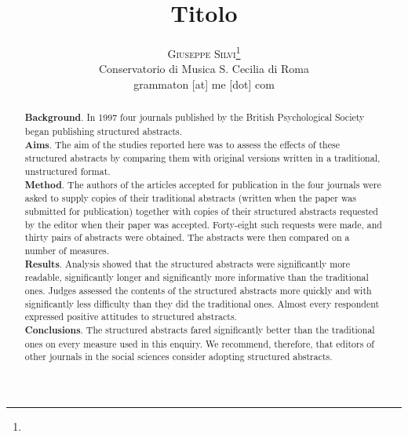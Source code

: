 \documentclass[twoside]{article}
\title{\vspace{-15mm}\fontsize{24pt}{10pt}\selectfont\textbf{Titolo}} %
\author{
\large
\textsc{Giuseppe Silvi}\thanks{}\\[2mm] %
\normalsize Conservatorio di Musica S. Cecilia di Roma \\ %
\normalsize grammaton [at] me [dot] com \\ %
\vspace{-5mm}
}
\date{}
\begin{document}
\maketitle %

\thispagestyle{fancy} %


\begin{abstract}

\noindent %
\textbf{Background}. In 1997 four journals published by the British Psychological Society began publishing structured abstracts.\\
\textbf{Aims}. The aim of the studies reported here was to assess the effects of these structured abstracts by comparing them with original versions written in a traditional, unstructured format.\\
\textbf{Method}. The authors of the articles accepted for publication in the four journals were asked to supply copies of their traditional abstracts (written when the paper was submitted for publication) together with copies of their structured abstracts requested by the editor when their paper was accepted. Forty-eight such requests were made, and thirty pairs of abstracts were obtained. The abstracts were then compared on a number of measures.\\
\textbf{Results}. Analysis showed that the structured abstracts were significantly more readable, significantly longer and significantly more informative than the traditional ones. Judges assessed the contents of the structured abstracts more quickly and with significantly less difficulty than they did the traditional ones. Almost every respondent expressed positive attitudes to structured abstracts.\\
\textbf{Conclusions}. The structured abstracts fared significantly better than the traditional ones on every measure used in this enquiry. We recommend, therefore, that editors of other journals in the social sciences consider adopting structured abstracts.

\end{abstract}

\end{document}
